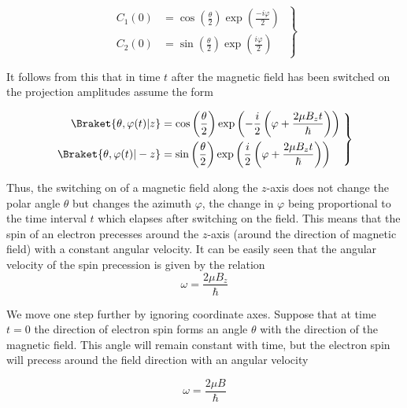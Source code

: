 \documentclass[a4paper,sfsidenotes,colorlinks=true]{tufte-book}
\numberwithin{equation}{section}
\numberwithin{figure}{section}
\begin{document}
\begin{equation}%
\left.
\begin{split}
C_{1}(0) & = \cos \left( \frac{\theta}{2} \right)  \exp \left( \frac{-i
    \varphi}{2} \right) \\   
C_{2}(0) & = \sin \left( \frac{\theta}{2} \right)  \exp \left( \frac{i
    \varphi}{2} \right) 
\end{split}
\; \right\}
\label{eq-14.15}
\end{equation}

It follows from this that in time $t$ after the magnetic field has been
switched on the projection amplitudes assume the form

\begin{equation}%
\left.
\begin{split}
\Braket{\theta, \varphi(t) | z}  & =  \cos \left( \frac{\theta}{2}
\right) \exp \left(-\frac{i}{2} \left( \varphi +  \frac{2 \mu B_{z}
      t}{\hbar} \right) \right) \\   
\Braket{\theta, \varphi(t) | - z}  & = \sin \left( \frac{\theta}{2} \right)  \exp \left(\frac{i}{2} \left( \varphi +  \frac{2 \mu B_{z}
      t}{\hbar} \right) \right)
\end{split}
\; \right\}
\label{eq-14.16}
\end{equation}

Thus, the switching on of a magnetic field along the $z$-axis does not
change the polar angle $\theta$ but changes the azimuth $\varphi$, the
change in $\varphi$ being proportional to the time interval $t$ which
elapses after switching on the field. This means that the spin of an
electron precesses around the $z$-axis (around the direction of magnetic
field) with a constant angular velocity. It can be easily seen that
the angular velocity of the spin precession is given by the relation
\begin{equation}%
\omega = \frac{2 \mu B_{z}}{\hbar} 
\label{eq-14.17}
\end{equation}

We move one step further by ignoring coordinate axes. Suppose that at
time $t = 0$ the direction of electron spin forms an angle $\theta$ with the
direction of the magnetic field. This angle will remain constant with
time, but the electron spin will precess around the field direction
with an angular velocity 

\begin{equation}%
\omega = \frac{2 \mu B}{\hbar} 
\tag{14.17a}
\label{eq-14.17a}
\end{equation}
\end{document}
